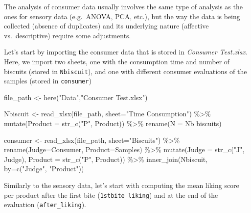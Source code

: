 \documentclass[
]{book}
\newenvironment{Shaded}{\begin{snugshade}}{\end{snugshade}}
\newcommand{\AttributeTok}[1]{\textcolor[rgb]{0.77,0.63,0.00}{#1}}
\newcommand{\FunctionTok}[1]{\textcolor[rgb]{0.00,0.00,0.00}{#1}}
\newcommand{\NormalTok}[1]{#1}
\newcommand{\OtherTok}[1]{\textcolor[rgb]{0.56,0.35,0.01}{#1}}
\newcommand{\SpecialCharTok}[1]{\textcolor[rgb]{0.00,0.00,0.00}{#1}}
\newcommand{\StringTok}[1]{\textcolor[rgb]{0.31,0.60,0.02}{#1}}
\begin{document}
The analysis of consumer data usually involves the same type of analysis as the ones for sensory data (e.g.~ANOVA, PCA, etc.), but the way the data is being collected (absence of duplicates) and its underlying nature (affective vs.~descriptive) require some adjustments.

Let's start by importing the consumer data that is stored in \emph{Consumer Test.xlsx}. Here, we import two sheets, one with the consumption time and number of biscuits (stored in \texttt{Nbiscuit}), and one with different consumer evaluations of the samples (stored in \texttt{consumer})

\begin{Shaded}
\begin{Highlighting}[]
\NormalTok{file\_path }\OtherTok{\textless{}{-}} \FunctionTok{here}\NormalTok{(}\StringTok{"Data"}\NormalTok{,}\StringTok{"Consumer Test.xlsx"}\NormalTok{)}

\NormalTok{Nbiscuit }\OtherTok{\textless{}{-}} \FunctionTok{read\_xlsx}\NormalTok{(file\_path, }\AttributeTok{sheet=}\StringTok{"Time Consumption"}\NormalTok{) }\SpecialCharTok{\%\textgreater{}\%} 
  \FunctionTok{mutate}\NormalTok{(}\AttributeTok{Product =} \FunctionTok{str\_c}\NormalTok{(}\StringTok{"P"}\NormalTok{, Product)) }\SpecialCharTok{\%\textgreater{}\%} 
  \FunctionTok{rename}\NormalTok{(}\AttributeTok{N =} \StringTok{\textasciigrave{}}\AttributeTok{Nb biscuits}\StringTok{\textasciigrave{}}\NormalTok{)}

\NormalTok{consumer }\OtherTok{\textless{}{-}} \FunctionTok{read\_xlsx}\NormalTok{(file\_path, }\AttributeTok{sheet=}\StringTok{"Biscuits"}\NormalTok{) }\SpecialCharTok{\%\textgreater{}\%} 
  \FunctionTok{rename}\NormalTok{(}\AttributeTok{Judge=}\NormalTok{Consumer, }\AttributeTok{Product=}\NormalTok{Samples) }\SpecialCharTok{\%\textgreater{}\%} 
  \FunctionTok{mutate}\NormalTok{(}\AttributeTok{Judge =} \FunctionTok{str\_c}\NormalTok{(}\StringTok{"J"}\NormalTok{, Judge), }\AttributeTok{Product =} \FunctionTok{str\_c}\NormalTok{(}\StringTok{"P"}\NormalTok{, Product)) }\SpecialCharTok{\%\textgreater{}\%} 
  \FunctionTok{inner\_join}\NormalTok{(Nbiscuit, }\AttributeTok{by=}\FunctionTok{c}\NormalTok{(}\StringTok{"Judge"}\NormalTok{, }\StringTok{"Product"}\NormalTok{))}
\end{Highlighting}
\end{Shaded}

Similarly to the sensory data, let's start with computing the mean liking score per product after the first bite (\texttt{1stbite\_liking}) and at the end of the evaluation (\texttt{after\_liking}).
\end{document}
